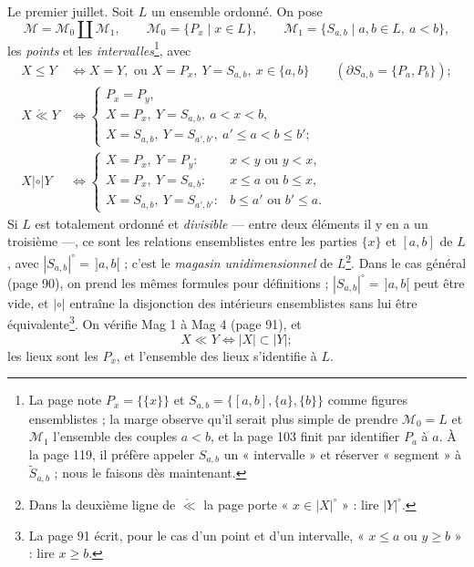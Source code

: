 \documentclass[11pt,a4paper]{article}
\begin{document}
Le premier juillet. Soit $L$ un ensemble ordonné. On pose
\[
\mathcal{M} = \mathcal{M}_{0} \amalg \mathcal{M}_{1}, \qquad
\mathcal{M}_{0} = \{P_{x} \mid x \in L\}, \qquad \mathcal{M}_{1} = \{S_{a,b}
\mid a, b \in L,\ a < b\},
\]
les \emph{points} et les \emph{intervalles}\footnote{La page note $P_{x} =
\{\{x\}\}$ et $S_{a,b} = \{[a,b], \{a\}, \{b\}\}$ comme figures ensemblistes ;
la marge observe qu'il serait plus simple de prendre $\mathcal{M}_{0} = L$ et
$\mathcal{M}_{1}$ l'ensemble des couples $a < b$, et la page 103 finit par
identifier $P_{a}$ à $a$. À la page 119, il préfère appeler $S_{a,b}$ un
« intervalle » et réserver « segment » à $\widetilde{S}_{a,b}$ ; nous le
faisons dès maintenant.}, avec
\[
\begin{aligned}
X \leq Y &\iff X = Y, \text{ ou } X = P_{x},\ Y = S_{a,b},\ x \in \{a, b\}
\qquad (\partial S_{a,b} = \{P_{a}, P_{b}\}) ; \\
X \mathrel{\mathring{\ll}} Y &\iff
\begin{cases}
P_{x} = P_{y}, \\
X = P_{x},\ Y = S_{a,b},\ a < x < b, \\
X = S_{a,b},\ Y = S_{a',b'},\ a' \leq a < b \leq b' ;
\end{cases} \\
X \mathrel{|\circ|} Y &\iff
\begin{cases}
X = P_{x},\ Y = P_{y} : & x < y \text{ ou } y < x, \\
X = P_{x},\ Y = S_{a,b} : & x \leq a \text{ ou } b \leq x, \\
X = S_{a,b},\ Y = S_{a',b'} : & b \leq a' \text{ ou } b' \leq a .
\end{cases}
\end{aligned}
\]
Si $L$ est totalement ordonné et \emph{divisible} --- entre deux éléments il y
en a un troisième ---, ce sont les relations ensemblistes entre les parties
$\{x\}$ et $[a,b]$ de $L$, avec $|S_{a,b}|^{\circ} = \,]a,b[$ ; c'est le
\emph{magasin unidimensionnel} de $L$\footnote{Dans la deuxième ligne de
$\mathring{\ll}$ la page porte « $x \in |X|^{\circ}$ » : lire $|Y|^{\circ}$.}.
Dans le cas général (page 90), on prend les mêmes formules pour définitions ;
$|S_{a,b}|^{\circ} = \,]a,b[$ peut être vide, et $\mathrel{|\circ|}$ entraîne
la disjonction des intérieurs ensemblistes sans lui être équivalente\footnote{La
page 91 écrit, pour le cas d'un point et d'un intervalle, « $x \leq a$ ou $y
\geq b$ » : lire $x \geq b$.}. On vérifie Mag 1 à Mag 4 (page 91), et
\[
X \ll Y \iff |X| \subset |Y| ;
\]
les lieux sont les $P_{x}$, et l'ensemble des lieux s'identifie à $L$.
\end{document}
